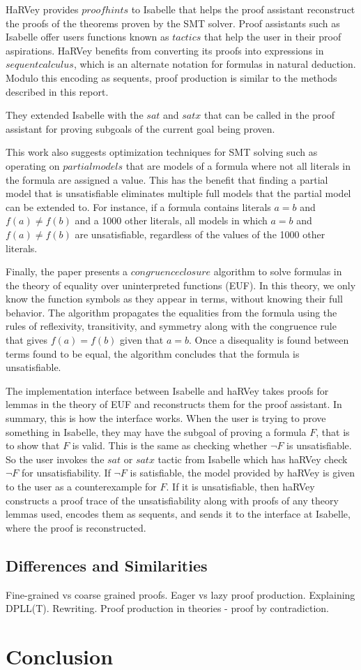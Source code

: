 \documentclass{article}
\begin{document}
HaRVey provides $proof hints$ to Isabelle that 
helps the proof assistant reconstruct the proofs 
of the theorems proven by the SMT solver. Proof 
assistants such as Isabelle offer users functions 
known as $tactics$ that help the user in their 
proof aspirations. HaRVey benefits from converting 
its proofs into expressions in $sequent calculus$, 
which is an alternate notation for formulas in 
natural deduction. Modulo this encoding as sequents, 
proof production is similar to the methods described 
in this report. 

They extended Isabelle with the $sat$ and $satx$ 
that can be called in the proof assistant for 
proving subgoals of the current goal being proven.
 
This work also suggests optimization techniques 
for SMT solving such as operating on $partial 
models$ that are models of a formula where not all 
literals in the formula are assigned a value. This has 
the benefit that finding a partial model that is 
unsatisfiable eliminates multiple full models that the 
partial model can be extended to. For instance, if 
a formula contains literals $a = b$ and 
$f(a) \neq f(b)$ and a 1000 other literals, all models 
in which $a = b$ and $f(a) \neq f(b)$ are unsatisfiable, 
regardless of the values of the 1000 other literals.

Finally, the paper presents a $congruence closure$ 
algorithm to solve formulas in the theory of 
equality over uninterpreted functions (EUF). In 
this theory, we only know the function symbols 
as they appear in terms, without knowing their 
full behavior. The algorithm propagates the equalities
from the formula using the rules of reflexivity, 
transitivity, and symmetry along with the congruence rule
that gives $f(a) = f(b)$ given that $a = b$. Once a 
disequality is found between terms found to be equal, 
the algorithm concludes that the formula is unsatisfiable.

The implementation interface between Isabelle and haRVey 
takes proofs for lemmas in the theory of EUF and 
reconstructs them for the proof assistant. In summary,
this is how the interface works. When the user is trying 
to prove something in Isabelle, they may have the 
subgoal of proving a formula $F$, that is to show that 
$F$ is valid. This is the same as checking whether 
$\neg F$ is unsatisfiable. So the user invokes the $sat$ 
or $satx$ tactic from Isabelle which has haRVey check 
$\neg F$ for unsatisfiability. If $\neg F$ is 
satisfiable, the model provided by haRVey is given 
to the user as a counterexample for $F$. 
If it is unsatisfiable, then haRVey constructs a proof
trace of the unsatisfiability along with proofs of 
any theory lemmas used, encodes them as sequents,
and sends it to the interface at Isabelle, 
where the proof is reconstructed.

\subsection{Differences and Similarities}
Fine-grained vs coarse grained proofs. Eager vs lazy 
proof production. Explaining DPLL(T).
Rewriting. Proof production in theories - proof by contradiction.
\section{Conclusion}
\label{sec:conc}



\end{document}
